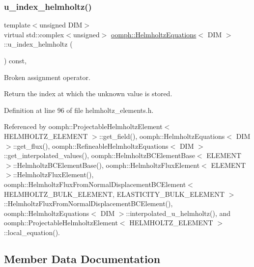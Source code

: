 \subsubsection{\texorpdfstring{u\+\_\+index\+\_\+helmholtz()}{u\_index\_helmholtz()}}
{\footnotesize\ttfamily template$<$unsigned D\+IM$>$ \\
virtual std\+::complex$<$unsigned$>$ \hyperlink{classoomph_1_1HelmholtzEquations}{oomph\+::\+Helmholtz\+Equations}$<$ D\+IM $>$\+::u\+\_\+index\+\_\+helmholtz (\begin{DoxyParamCaption}{ }\end{DoxyParamCaption}) const\hspace{0.3cm}{\ttfamily [inline]}, {\ttfamily [virtual]}}



Broken assignment operator. 

Return the index at which the unknown value is stored. 

Definition at line 96 of file helmholtz\+\_\+elements.\+h.



Referenced by oomph\+::\+Projectable\+Helmholtz\+Element$<$ H\+E\+L\+M\+H\+O\+L\+T\+Z\+\_\+\+E\+L\+E\+M\+E\+N\+T $>$\+::get\+\_\+field(), oomph\+::\+Helmholtz\+Equations$<$ D\+I\+M $>$\+::get\+\_\+flux(), oomph\+::\+Refineable\+Helmholtz\+Equations$<$ D\+I\+M $>$\+::get\+\_\+interpolated\+\_\+values(), oomph\+::\+Helmholtz\+B\+C\+Element\+Base$<$ E\+L\+E\+M\+E\+N\+T $>$\+::\+Helmholtz\+B\+C\+Element\+Base(), oomph\+::\+Helmholtz\+Flux\+Element$<$ E\+L\+E\+M\+E\+N\+T $>$\+::\+Helmholtz\+Flux\+Element(), oomph\+::\+Helmholtz\+Flux\+From\+Normal\+Displacement\+B\+C\+Element$<$ H\+E\+L\+M\+H\+O\+L\+T\+Z\+\_\+\+B\+U\+L\+K\+\_\+\+E\+L\+E\+M\+E\+N\+T, E\+L\+A\+S\+T\+I\+C\+I\+T\+Y\+\_\+\+B\+U\+L\+K\+\_\+\+E\+L\+E\+M\+E\+N\+T $>$\+::\+Helmholtz\+Flux\+From\+Normal\+Displacement\+B\+C\+Element(), oomph\+::\+Helmholtz\+Equations$<$ D\+I\+M $>$\+::interpolated\+\_\+u\+\_\+helmholtz(), and oomph\+::\+Projectable\+Helmholtz\+Element$<$ H\+E\+L\+M\+H\+O\+L\+T\+Z\+\_\+\+E\+L\+E\+M\+E\+N\+T $>$\+::local\+\_\+equation().



\subsection{Member Data Documentation}
\mbox{\label{classoomph_1_1HelmholtzEquations_a4c7cc6c365429927ab113b2fc26988c0}} 
